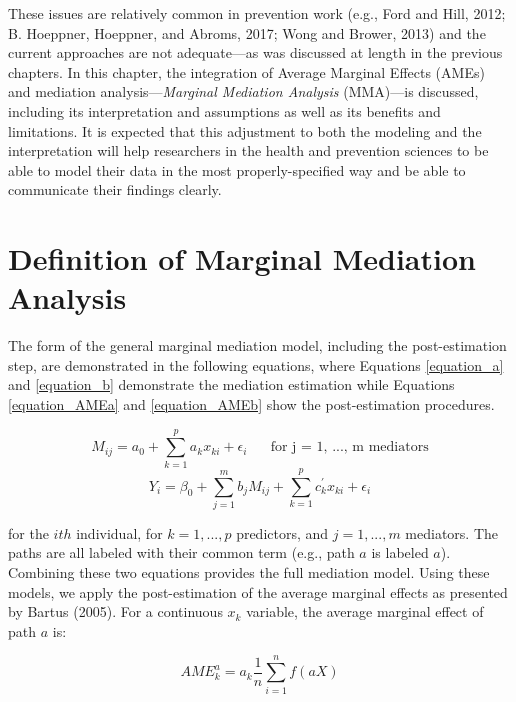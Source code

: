 \documentclass[]{DissertateUSU}
\begin{document}
\noindent These issues are relatively common in prevention work (e.g.,
Ford and Hill, 2012; B. Hoeppner, Hoeppner, and Abroms, 2017; Wong and
Brower, 2013) and the current approaches are not adequate---as was
discussed at length in the previous chapters. In this chapter, the
integration of Average Marginal Effects (AMEs) and mediation
analysis---\emph{Marginal Mediation Analysis} (MMA)---is discussed,
including its interpretation and assumptions as well as its benefits and
limitations. It is expected that this adjustment to both the modeling
and the interpretation will help researchers in the health and
prevention sciences to be able to model their data in the most
properly-specified way and be able to communicate their findings
clearly.

\section{Definition of Marginal Mediation
Analysis}\label{definition-of-marginal-mediation-analysis}

The form of the general marginal mediation model, including the
post-estimation step, are demonstrated in the following equations, where
Equations \ref{equation_a} and \ref{equation_b} demonstrate the
mediation estimation while Equations \ref{equation_AMEa} and
\ref{equation_AMEb} show the post-estimation procedures.

\begin{equation}\label{equation_a}
M_{ij} = a_0 + \sum_{k=1}^p a_k x_{ki} + \epsilon_i \text{ }\text{ }\text{ for j = 1, ..., m mediators}
\end{equation}\begin{equation}\label{equation_b}
Y_{i} = \beta_0 + \sum_{j = 1}^m b_j M_{ij} + \sum_{k=1}^p c_k^{'} x_{ki} + \epsilon_i
\end{equation}

\noindent for the \(ith\) individual, for \(k = 1, ..., p\) predictors,
and \(j = 1, ..., m\) mediators. The paths are all labeled with their
common term (e.g., path \(a\) is labeled \(a\)). Combining these two
equations provides the full mediation model. Using these models, we
apply the post-estimation of the average marginal effects as presented
by Bartus (2005). For a continuous \(x_k\) variable, the average
marginal effect of path \(a\) is:

\begin{equation}\label{equation_AMEa}
AME^a_k = a_k \frac{1}{n} \sum_{i=1}^n f(a X)
\end{equation}
\end{document}
